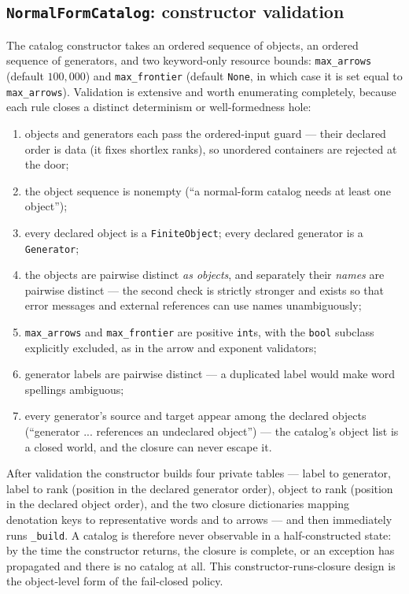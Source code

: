 \subsection{\texttt{NormalFormCatalog}: constructor validation}

The catalog constructor takes an ordered sequence of objects, an ordered
sequence of generators, and two keyword-only resource bounds:
\texttt{max\_arrows} (default $100{,}000$) and \texttt{max\_frontier}
(default \texttt{None}, in which case it is set equal to
\texttt{max\_arrows}). Validation is extensive and worth enumerating
completely, because each rule closes a distinct determinism or
well-formedness hole:

\begin{enumerate}
\item objects and generators each pass the ordered-input guard --- their
      declared order is data (it fixes shortlex ranks), so unordered
      containers are rejected at the door;
\item the object sequence is nonempty (``a normal-form catalog needs at
      least one object'');
\item every declared object is a \texttt{FiniteObject}; every declared
      generator is a \texttt{Generator};
\item the objects are pairwise distinct \emph{as objects}, and separately
      their \emph{names} are pairwise distinct --- the second check is
      strictly stronger and exists so that error messages and external
      references can use names unambiguously;
\item \texttt{max\_arrows} and \texttt{max\_frontier} are positive
      \texttt{int}s, with the \texttt{bool} subclass explicitly excluded,
      as in the arrow and exponent validators;
\item generator labels are pairwise distinct --- a duplicated label would
      make word spellings ambiguous;
\item every generator's source and target appear among the declared
      objects (``generator ... references an undeclared object'') --- the
      catalog's object list is a closed world, and the closure can never
      escape it.
\end{enumerate}

After validation the constructor builds four private tables --- label to
generator, label to rank (position in the declared generator order),
object to rank (position in the declared object order), and the two
closure dictionaries mapping denotation keys to representative words and
to arrows --- and then immediately runs \texttt{\_build}. A catalog is
therefore never observable in a half-constructed state: by the time the
constructor returns, the closure is complete, or an exception has
propagated and there is no catalog at all. This constructor-runs-closure
design is the object-level form of the fail-closed policy.

